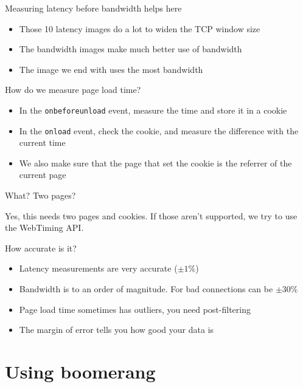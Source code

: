 \documentclass{beamer}
\begin{document}
\begin{frame}{Measuring latency before bandwidth helps here}
  \begin{itemize}
  \item Those 10 latency images do a lot to widen the TCP window size
  \item The bandwidth images make much better use of bandwidth
  \item The image we end with uses the most bandwidth
  \end{itemize}
\end{frame}

\begin{frame}{How do we measure page load time?}
  \begin{itemize}
  \item In the \texttt{onbeforeunload} event, measure the time and store it in a cookie
  \item In the \texttt{onload} event, check the cookie, and measure the difference with the current time
  \item We also make sure that the page that set the cookie is the referrer of the current page
  \end{itemize}
\end{frame}

\begin{frame}{What? Two pages?}
  \begin{center}
  Yes, this needs two pages and cookies.  If those aren't supported, we try to use the WebTiming API.
  \end{center}
\end{frame}

\begin{frame}{How accurate is it?}
  \begin{itemize}
  \item Latency measurements are very accurate (\(\pm 1\%\))
  \item Bandwidth is to an order of magnitude. For bad connections can be \(\pm 30\%\)
  \item Page load time sometimes has outliers, you need post-filtering
  \item The margin of error tells you how good your data is
  \end{itemize}
\end{frame}

\section{Using boomerang}
\label{sec:use}
\end{document}
